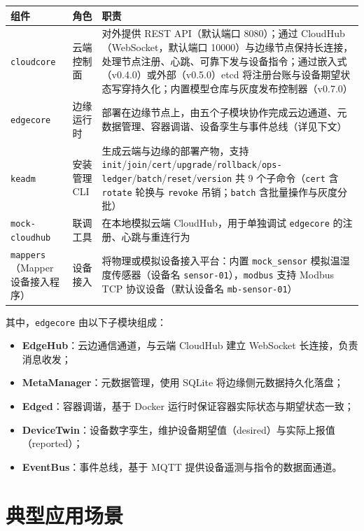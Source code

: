 \begin{tabularx}{\textwidth}{|l|l|X|}
  \hline
  \textbf{组件} & \textbf{角色} & \textbf{职责} \\
  \hline
  \texttt{cloudcore} & 云端控制面 & 对外提供 REST API（默认端口 8080）；通过 CloudHub（WebSocket，默认端口 10000）与边缘节点保持长连接，处理节点注册、心跳、可靠下发与设备指令；通过嵌入式（v0.4.0）或外部（v0.5.0）etcd 将注册台账与设备期望状态写穿持久化；内置模型仓库与灰度发布控制器（v0.7.0） \\
  \hline
  \texttt{edgecore} & 边缘运行时 & 部署在边缘节点上，由五个子模块协作完成云边通道、元数据管理、容器调谐、设备孪生与事件总线（详见下文） \\
  \hline
  \texttt{keadm} & 安装管理 CLI & 生成云端与边缘的部署产物，支持 \texttt{init}/\texttt{join}/\texttt{cert}/\texttt{upgrade}/\texttt{rollback}/\texttt{ops-ledger}/\texttt{batch}/\texttt{reset}/\texttt{version} 共 9 个子命令（\texttt{cert} 含 \texttt{rotate} 轮换与 \texttt{revoke} 吊销；\texttt{batch} 含批量操作与灰度分批） \\
  \hline
  \texttt{mock-cloudhub} & 联调工具 & 在本地模拟云端 CloudHub，用于单独调试 \texttt{edgecore} 的注册、心跳与重连行为 \\
  \hline
  \texttt{mappers}（Mapper 设备接入程序） & 设备接入 & 将物理或模拟设备接入平台：内置 \texttt{mock\_sensor} 模拟温湿度传感器（设备名 \texttt{sensor-01}），\texttt{modbus} 支持 Modbus TCP 协议设备（默认设备名 \texttt{mb-sensor-01}） \\
  \hline
\end{tabularx}

其中，\texttt{edgecore} 由以下子模块组成：

\begin{itemize}
  \item \textbf{EdgeHub}：云边通信通道，与云端 CloudHub 建立 WebSocket 长连接，负责消息收发；
  \item \textbf{MetaManager}：元数据管理，使用 SQLite 将边缘侧元数据持久化落盘；
  \item \textbf{Edged}：容器调谐，基于 Docker 运行时保证容器实际状态与期望状态一致；
  \item \textbf{DeviceTwin}：设备数字孪生，维护设备期望值（desired）与实际上报值（reported）；
  \item \textbf{EventBus}：事件总线，基于 MQTT 提供设备遥测与指令的数据面通道。
\end{itemize}

\section{典型应用场景}

